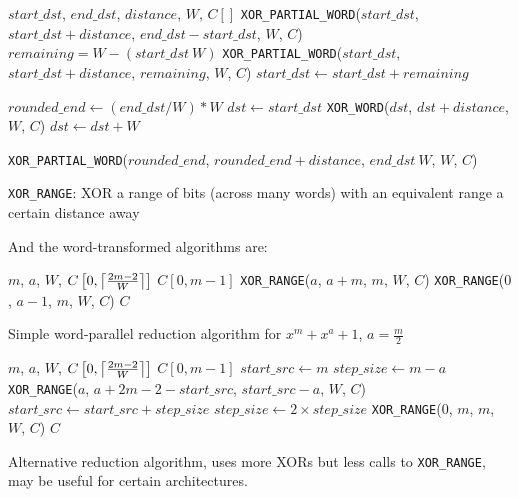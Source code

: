 \begin{algorithm}
\begin{algorithmic}[1]
  \REQUIRE $start\_dst$, $end\_dst$, $distance$, $W$, $C[]$
    \STATE \texttt{XOR\_PARTIAL\_WORD}($start\_dst$, $start\_dst + distance$, $end\_dst - start\_dst$, $W$, $C$)
  \ELSE
      \STATE $remaining = W - (start\_dst \ W)$
      \STATE \texttt{XOR\_PARTIAL\_WORD}($start\_dst$, $start\_dst + distance$, $remaining$, $W$, $C$)
      \STATE $start\_dst \gets start\_dst + remaining$
    \ENDIF
    
    \STATE $rounded\_end \gets (end\_dst / W) * W$
    \STATE $dst \gets start\_dst$
      \STATE \texttt{XOR\_WORD}($dst$, $dst + distance$, $W$, $C$)
      \STATE $dst \gets dst + W$
    \ENDWHILE
    
      \STATE \texttt{XOR\_PARTIAL\_WORD}($rounded\_end$, $rounded\_end + distance$, $end\_dst \ W$, $W$, $C$)
    \ENDIF
  \ENDIF
  \caption{\texttt{XOR\_RANGE}: XOR a range of bits (across many words) with an equivalent range a certain distance away}
\end{algorithmic}
\end{algorithm}


And the word-transformed algorithms are:

\begin{algorithm}
\begin{algorithmic}[1]
  \REQUIRE $m$, $a$, $W$, $C\left[0,\ceil*{\frac{2m-2}{W}}\right]$
  \ENSURE $C[0,m-1]$
  \STATE \texttt{XOR\_RANGE}($a$, $a+m$, $m$, $W$, $C$)
  \STATE \texttt{XOR\_RANGE}($0$, $a-1$, $m$, $W$, $C$)
  \RETURN $C$
  \caption{Simple word-parallel reduction algorithm for $x^m + x^a +1$, $a = \frac{m}{2}$}
  \label{alg:equallyspaced:word:operation}
\end{algorithmic}
\end{algorithm}

\begin{algorithm}
\begin{algorithmic}[1]
  \REQUIRE $m$, $a$, $W$, $C\left[0,\ceil*{\frac{2m-2}{W}}\right]$
  \ENSURE $C[0,m-1]$
  \STATE $start\_src \gets m$
  \STATE $step\_size \gets m - a$
    \STATE \texttt{XOR\_RANGE}($a$, $a + 2m-2 - start\_src$, $start\_src - a$, $W$, $C$)
    \STATE $start\_src \gets start\_src + step\_size$
    \STATE $step\_size \gets 2 \times step\_size$
  \ENDWHILE
  \STATE \texttt{XOR\_RANGE}($0$, $m$, $m$, $W$, $C$)
  \RETURN $C$
  \caption{Alternative reduction algorithm, uses more XORs but less calls to \texttt{XOR\_RANGE}, may be useful for certain architectures.}
  \label{alg:new:word:operation}
\end{algorithmic}
\end{algorithm}